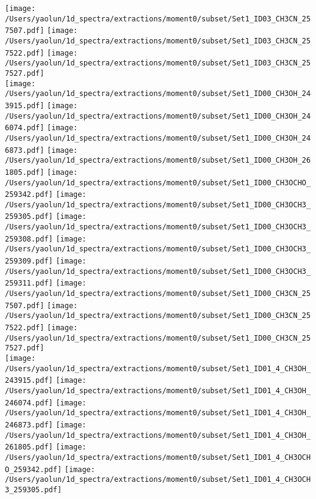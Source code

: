 \begin{figure*}[htbp!]
  \texttt{[image: /Users/yaolun/1d\_spectra/extractions/moment0/subset/Set1\_ID03\_CH3CN\_257507.pdf]}
  \texttt{[image: /Users/yaolun/1d\_spectra/extractions/moment0/subset/Set1\_ID03\_CH3CN\_257522.pdf]}
  \texttt{[image: /Users/yaolun/1d\_spectra/extractions/moment0/subset/Set1\_ID03\_CH3CN\_257527.pdf]}
  \\
  \texttt{[image: /Users/yaolun/1d\_spectra/extractions/moment0/subset/Set1\_ID00\_CH3OH\_243915.pdf]}
  \texttt{[image: /Users/yaolun/1d\_spectra/extractions/moment0/subset/Set1\_ID00\_CH3OH\_246074.pdf]}
  \texttt{[image: /Users/yaolun/1d\_spectra/extractions/moment0/subset/Set1\_ID00\_CH3OH\_246873.pdf]}
  \texttt{[image: /Users/yaolun/1d\_spectra/extractions/moment0/subset/Set1\_ID00\_CH3OH\_261805.pdf]}
  \texttt{[image: /Users/yaolun/1d\_spectra/extractions/moment0/subset/Set1\_ID00\_CH3OCHO\_259342.pdf]}
  \texttt{[image: /Users/yaolun/1d\_spectra/extractions/moment0/subset/Set1\_ID00\_CH3OCH3\_259305.pdf]}
  \texttt{[image: /Users/yaolun/1d\_spectra/extractions/moment0/subset/Set1\_ID00\_CH3OCH3\_259308.pdf]}
  \texttt{[image: /Users/yaolun/1d\_spectra/extractions/moment0/subset/Set1\_ID00\_CH3OCH3\_259309.pdf]}
  \texttt{[image: /Users/yaolun/1d\_spectra/extractions/moment0/subset/Set1\_ID00\_CH3OCH3\_259311.pdf]}
  \texttt{[image: /Users/yaolun/1d\_spectra/extractions/moment0/subset/Set1\_ID00\_CH3CN\_257507.pdf]}
  \texttt{[image: /Users/yaolun/1d\_spectra/extractions/moment0/subset/Set1\_ID00\_CH3CN\_257522.pdf]}
  \texttt{[image: /Users/yaolun/1d\_spectra/extractions/moment0/subset/Set1\_ID00\_CH3CN\_257527.pdf]}
  \\
  \texttt{[image: /Users/yaolun/1d\_spectra/extractions/moment0/subset/Set1\_ID01\_4\_CH3OH\_243915.pdf]}
  \texttt{[image: /Users/yaolun/1d\_spectra/extractions/moment0/subset/Set1\_ID01\_4\_CH3OH\_246074.pdf]}
  \texttt{[image: /Users/yaolun/1d\_spectra/extractions/moment0/subset/Set1\_ID01\_4\_CH3OH\_246873.pdf]}
  \texttt{[image: /Users/yaolun/1d\_spectra/extractions/moment0/subset/Set1\_ID01\_4\_CH3OH\_261805.pdf]}
  \texttt{[image: /Users/yaolun/1d\_spectra/extractions/moment0/subset/Set1\_ID01\_4\_CH3OCHO\_259342.pdf]}
  \texttt{[image: /Users/yaolun/1d\_spectra/extractions/moment0/subset/Set1\_ID01\_4\_CH3OCH3\_259305.pdf]}

\end{figure*}

